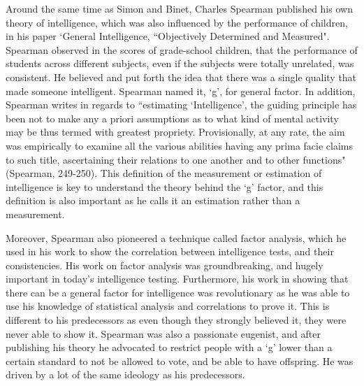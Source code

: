 \documentclass[12pt, oneside]{article}
\begin{document}
\par Around the same time as Simon and Binet, Charles Spearman published his own theory of intelligence, which was also influenced by the performance of children, in his paper
`General Intelligence, ``Objectively Determined and Measured". Spearman observed in the scores of grade-school children, that the performance of students across different subjects, even if the subjects were totally unrelated, was consistent. He believed and put forth the idea that there was a single quality that made someone intelligent. Spearman named it, `g', for general factor. In addition, Spearman writes in regards to ``estimating `Intelligence', the guiding principle has been not to make any a priori assumptions as to what kind of mental activity may be thus termed with greatest propriety. Provisionally, at any rate, the aim was empirically to examine all the various abilities having any prima facie claims to such title, ascertaining their relations to one another and to other functions" (Spearman, 249-250). This definition of the measurement or estimation of intelligence is key to understand the theory behind the `g' factor, and this definition is also important as he calls it an estimation rather than a measurement.

\par Moreover, Spearman also pioneered a technique called factor analysis, which he used in his work to show the correlation between intelligence tests, and their consistencies. His work on factor analysis was groundbreaking, and hugely important in today's intelligence testing. Furthermore, his work in showing that there can be a general factor for intelligence was revolutionary as he was able to use his knowledge of statistical analysis and correlations to prove it. This is different to his predecessors as even though they strongly believed it, they were never able to show it. Spearman was also a passionate eugenist, and after publishing his theory he advocated to restrict people with a `g' lower than a certain standard to not be allowed to vote, and be able to have offspring. He was driven by a lot of the same ideology as his predecessors.
\end{document}
